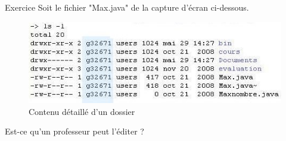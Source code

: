 \documentclass[a4paper,11pt]{article}
\begin{document}
\begin{Exercice}{Exercice}
	Soit le fichier "Max.java" de la capture d'\'ecran ci-dessous.  
	\begin{figure}[hbt]
		\begin{center}
			\includegraphics[width=0.8\linewidth,height=0.8\textheight,keepaspectratio=true]{image/ls-l.jpg}
			
		\end{center}
		
		\caption[Contenu d\'etaill\'e d'un dossier]{Contenu d\'etaill\'e d'un dossier}
	\end{figure}
	
	Est-ce qu'un professeur peut l'\'editer ? 
	
	 {\footnotesize\emph{}\par} 
\end{Exercice}	
\end{document}
